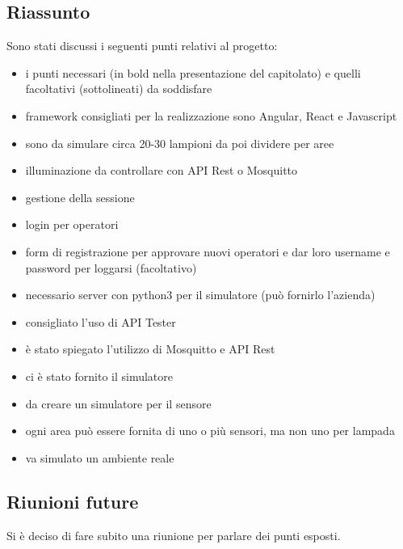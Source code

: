 \documentclass[12pt]{article}
\begin{document}
\subsection{Riassunto}
Sono stati discussi i seguenti punti relativi al progetto:
\begin{itemize}
    \item i punti necessari (in bold nella presentazione del capitolato) e quelli facoltativi (sottolineati) da soddisfare
    \item framework consigliati per la realizzazione sono Angular, React e Javascript
    \item sono da simulare circa 20-30 lampioni da poi dividere per aree
    \item illuminazione da controllare con API Rest o Mosquitto
    \item gestione della sessione
    \item login per operatori
    \item form di registrazione per approvare nuovi operatori e dar loro username e password per loggarsi (facoltativo)
    \item necessario server con python3 per il simulatore (può fornirlo l'azienda)
    \item consigliato l'uso di API Tester
    \item è stato spiegato l'utilizzo di Mosquitto e API Rest
    \item ci è stato fornito il simulatore
    \item da creare un simulatore per il sensore
    \item ogni area può essere fornita di uno o più sensori, ma non uno per lampada
    \item va simulato un ambiente reale
\end{itemize}
\subsection{Riunioni future}
Si è deciso di fare subito una riunione per parlare dei punti esposti.
\end{document}
